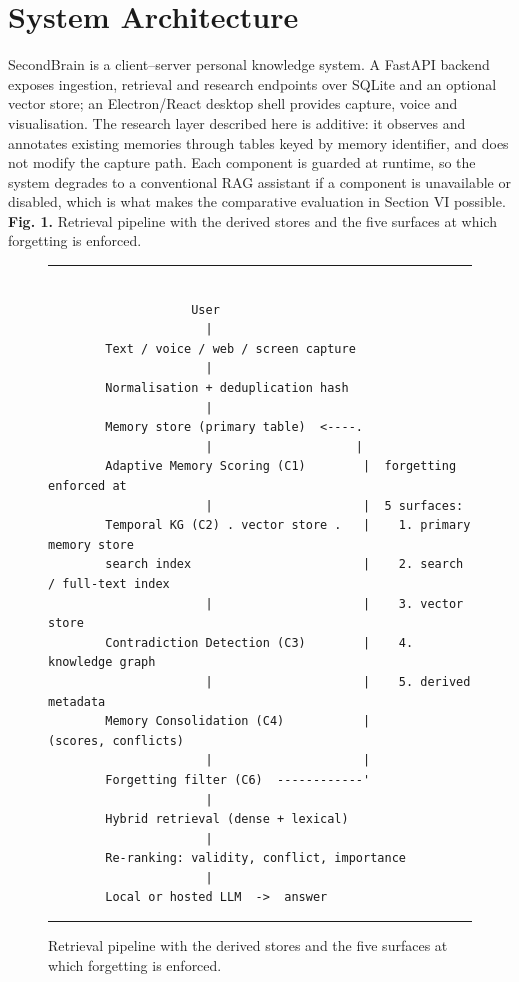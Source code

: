\documentclass[conference]{IEEEtran}
\begin{document}
\section{System Architecture}
SecondBrain is a client--server personal knowledge system. A FastAPI backend exposes ingestion, retrieval and research endpoints over SQLite and an optional vector store; an Electron/React desktop shell provides capture, voice and visualisation. The research layer described here is additive: it observes and annotates existing memories through tables keyed by memory identifier, and does not modify the capture path. Each component is guarded at runtime, so the system degrades to a conventional RAG assistant if a component is unavailable or disabled, which is what makes the comparative evaluation in Section VI possible.
\textbf{Fig. 1.} Retrieval pipeline with the derived stores and the five surfaces at which forgetting is enforced.
\begin{figure}[!t]
\centering
\begin{minipage}{\columnwidth}
\hrule
\vspace{3pt}
\ttfamily\tiny
\begin{verbatim}

                    User
                      |
        Text / voice / web / screen capture
                      |
        Normalisation + deduplication hash
                      |
        Memory store (primary table)  <----.
                      |                    |
        Adaptive Memory Scoring (C1)        |  forgetting enforced at
                      |                     |  5 surfaces:
        Temporal KG (C2) . vector store .   |    1. primary memory store
        search index                        |    2. search / full-text index
                      |                     |    3. vector store
        Contradiction Detection (C3)        |    4. knowledge graph
                      |                     |    5. derived metadata
        Memory Consolidation (C4)           |       (scores, conflicts)
                      |                     |
        Forgetting filter (C6)  ------------'
                      |
        Hybrid retrieval (dense + lexical)
                      |
        Re-ranking: validity, conflict, importance
                      |
        Local or hosted LLM  ->  answer
\end{verbatim}
\vspace{2pt}
\hrule
\end{minipage}
\caption{Retrieval pipeline with the derived stores and the five surfaces at
which forgetting is enforced.}
\label{fig:pipeline}
\end{figure}
\end{document}
